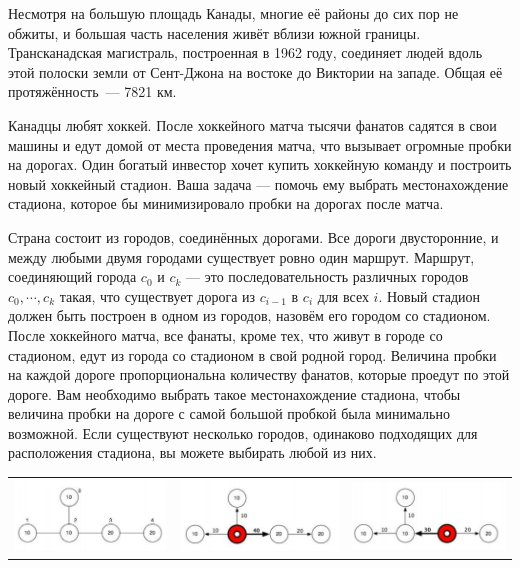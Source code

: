 Несмотря на большую площадь Канады, многие её районы до сих пор не обжиты, и большая часть населения живёт вблизи южной границы. Трансканадская магистраль, построенная в 1962 году, соединяет людей вдоль этой полоски земли от Сент-Джона на востоке до Виктории на западе. Общая её протяжённость~--- 7821 км.

Канадцы любят хоккей. После хоккейного матча тысячи фанатов садятся в свои машины и едут домой от места проведения матча, что вызывает огромные пробки на дорогах. Один богатый инвестор хочет купить хоккейную команду и построить новый хоккейный стадион. Ваша задача --- помочь ему выбрать местонахождение стадиона, которое бы минимизировало пробки на дорогах после матча.

Страна состоит из городов, соединённых дорогами. Все дороги двусторонние, и между любыми двумя городами существует ровно один маршрут. Маршрут, соединяющий города $c_0$ и $c_k$ --- это последовательность различных городов $c_0, \cdots, c_k$ такая, что существует дорога из $c_{i-1}$ в $c_i$ для всех $i$. Новый стадион должен быть построен в одном из городов, назовём его городом со стадионом. После хоккейного матча, все фанаты, кроме тех, что живут в городе со стадионом, едут из города со стадионом в свой родной город. Величина пробки на каждой дороге пропорциональна количеству фанатов, которые проедут по этой дороге. Вам необходимо выбрать такое местонахождение стадиона, чтобы величина пробки на дороге с самой большой пробкой была минимально возможной. Если существуют несколько городов, одинаково подходящих для расположения стадиона, вы можете выбирать любой из них.

\begin{tabular}{ccc}
\includegraphics[scale=0.45]{traffic1.png} &
\includegraphics[scale=0.45]{traffic2.png} &
\includegraphics[scale=0.45]{traffic3.png}
\end{tabular}

